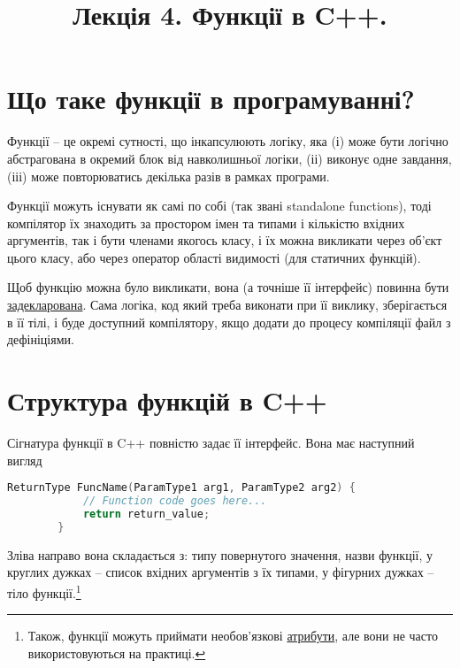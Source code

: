 \documentclass[12pt]{article}
\title{Лекція 4. Функції в C++.}
\begin{document}
	\maketitle

	\tableofcontents
	
	\section{Що таке функції в програмуванні?}
	Функції -- це окремі сутності, що інкапсулюють логіку, яка (і) може бути логічно абстрагована в окремий блок від навколишньої логіки, (іі) виконує одне завдання, (ііі) може повторюватись декілька разів в рамках програми.

	Функції можуть існувати як самі по собі (так звані standalone functions), тоді компілятор їх знаходить за простором імен та типами і кількістю вхідних аргументів, так і бути членами якогось класу, і їх можна викликати через об'єкт цього класу, або через оператор області видимості (для статичних функцій).

	Щоб функцію можна було викликати, вона (а точніше її інтерфейс) повинна бути \href{https://en.cppreference.com/w/cpp/language/function}{задекларована}. Сама логіка, код який треба виконати при її виклику, зберігається в її тілі, і буде доступний компілятору, якщо додати до процесу компіляції файл з дефініціями.

	\section{Структура функцій в C++}
	Сігнатура функції в C++ повністю задає її інтерфейс. Вона має наступний вигляд
	\begin{lstlisting}[language=c++]
		ReturnType FuncName(ParamType1 arg1, ParamType2 arg2) {
			// Function code goes here...
			return return_value; 
		}
	\end{lstlisting}

	Зліва направо вона складається з: типу повернутого значення, назви функції, у круглих дужках -- список вхідних аргументів з їх типами, у фігурних дужках -- тіло функції.\footnote{Також, функції можуть приймати необов'язкові \href{https://en.cppreference.com/w/cpp/language/attributes}{атрибути}, але вони не часто використовуються на практиці.}
	
\end{document}
